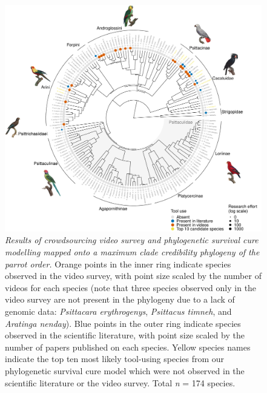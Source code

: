 \documentclass[
  man, donotrepeattitle,floatsintext]{apa6}
\begin{document}
\begin{figure}
\centering
\includegraphics{manuscript_files/figure-latex/plotPhylo1-1.pdf}
\caption{\label{fig:plotPhylo1}\emph{Results of crowdsourcing video survey and phylogenetic
survival cure modelling mapped onto a maximum clade credibility phylogeny of the
parrot order.} Orange points in the inner ring indicate species observed in the
video survey, with point size scaled by the number of videos for each species
(note that three species observed only in the video survey are not present in
the phylogeny due to a lack of genomic data: \emph{Psittacara erythrogenys},
\emph{Psittacus timneh}, and \emph{Aratinga nenday}). Blue points in the outer ring
indicate species observed in the scientific literature, with point size scaled
by the number of papers published on each species. Yellow species names indicate
the top ten most likely tool-using species from our phylogenetic survival cure
model which were not observed in the scientific literature or the video survey.
Total \emph{n} = 174 species.}
\end{figure}
\end{document}
